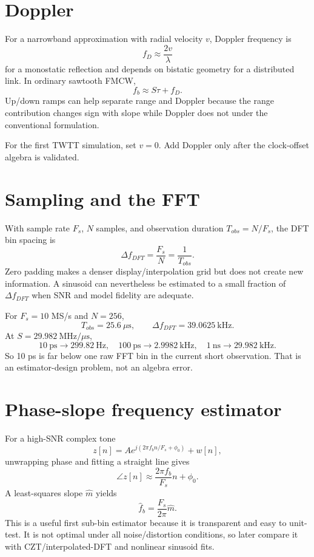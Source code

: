 \documentclass[11pt]{article}
\begin{document}
\section{Doppler}
For a narrowband approximation with radial velocity $v$, Doppler frequency is
\[
f_D\approx \frac{2v}{\lambda}
\]
for a monostatic reflection and depends on bistatic geometry for a distributed link. In ordinary sawtooth FMCW,
\[
f_b\approx S\tau+f_D.
\]
Up/down ramps can help separate range and Doppler because the range contribution changes sign with slope while Doppler does not under the conventional formulation.

For the first TWTT simulation, set $v=0$. Add Doppler only after the clock-offset algebra is validated.

\section{Sampling and the FFT}
With sample rate $F_s$, $N$ samples, and observation duration $T_{obs}=N/F_s$, the DFT bin spacing is
\[
\Delta f_{DFT}=\frac{F_s}{N}=\frac{1}{T_{obs}}.
\]
Zero padding makes a denser display/interpolation grid but does not create new information. A sinusoid can nevertheless be estimated to a small fraction of $\Delta f_{DFT}$ when SNR and model fidelity are adequate.

For $F_s=10$ MS/s and $N=256$,
\[
T_{obs}=25.6\ \mu\mathrm{s},\qquad \Delta f_{DFT}=39.0625\ \mathrm{kHz}.
\]
At $S=29.982\ \mathrm{MHz}/\mu\mathrm{s}$,
\[
10\ \mathrm{ps}\rightarrow 299.82\ \mathrm{Hz},\quad
100\ \mathrm{ps}\rightarrow 2.9982\ \mathrm{kHz},\quad
1\ \mathrm{ns}\rightarrow 29.982\ \mathrm{kHz}.
\]
So 10 ps is far below one raw FFT bin in the current short observation. That is an estimator-design problem, not an algebra error.

\section{Phase-slope frequency estimator}
For a high-SNR complex tone
\[
z[n]=A e^{j(2\pi f_b n/F_s+\phi_0)}+w[n],
\]
unwrapping phase and fitting a straight line gives
\[
\angle z[n]\approx \frac{2\pi f_b}{F_s}n+\phi_0.
\]
A least-squares slope $\hat m$ yields
\[
\hat f_b=\frac{F_s}{2\pi}\hat m.
\]
This is a useful first sub-bin estimator because it is transparent and easy to unit-test. It is not optimal under all noise/distortion conditions, so later compare it with CZT/interpolated-DFT and nonlinear sinusoid fits.
\end{document}
